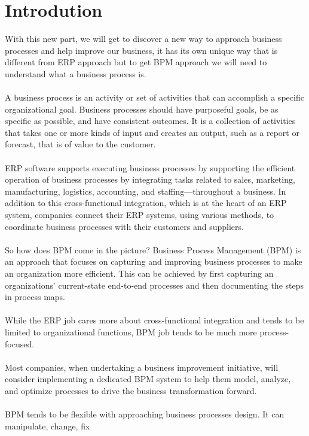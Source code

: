 \chapter{Introdution}

With this new part, we will get to discover a new way to approach business processes and help
improve our business, it has its own unique way that is different from ERP approach but to get BPM
approach we will need to understand what a business process is.\\\\
A business process is an activity or set of activities that can accomplish a specific organizational goal.
Business processes should have purposeful goals, be as specific as possible, and have consistent
outcomes. It is a collection of activities that takes one or more kinds of input and creates an output,
such as a report or forecast, that is of value to the customer.\\\\
ERP software supports executing business processes by supporting the efficient operation of business
processes by integrating tasks related to sales, marketing, manufacturing, logistics, accounting, and
staffing—throughout a business. In addition to this cross-functional integration, which is at the heart
of an ERP system, companies connect their ERP systems, using various methods, to coordinate
business processes with their customers and suppliers.\\\\
So how does BPM come in the picture? Business Process Management (BPM) is an approach that
focuses on capturing and improving business processes to make an organization more efficient. This
can be achieved by first capturing an organizations’ current-state end-to-end processes and then
documenting the steps in process maps.\\\\
While the ERP job cares more about cross-functional integration and tends to be limited to
organizational functions, BPM job tends to be much more process-focused.\\\\
Most companies, when undertaking a business improvement initiative, will consider implementing a
dedicated BPM system to help them model, analyze, and optimize processes to drive the business
transformation forward.\\\\
BPM tends to be flexible with approaching business processes design. It can manipulate, change, fix
